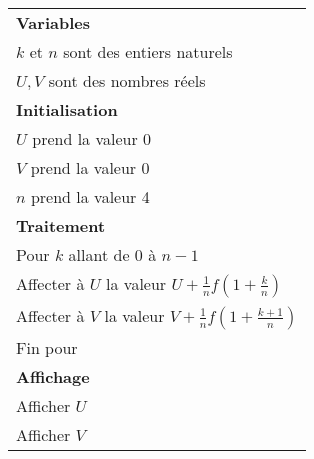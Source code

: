 \documentclass[10pt]{article}
\begin{document}
\begin{center}
\begin{tabularx}{0.6\linewidth}{|X|}\hline
\textbf{Variables}\\ 
\hspace{0,8cm}$k$ et $n$ sont des entiers naturels \\
\hspace{0,8cm}$U, V$ sont des nombres réels\\ 
\textbf{Initialisation}\\ 
\hspace{0,8cm} $U$ prend la valeur 0\\
\hspace{0,8cm} $V$ prend la valeur 0\\
\hspace{0,8cm} $n$ prend la valeur 4\\ 
\textbf{Traitement}\\ 
Pour $k$ allant de $0$ à $n - 1$\\ 
\hspace{0,8cm} Affecter à $U$ la valeur $U + \frac{1}{n}f\left(1 + \frac{k}{n}\right)$\\ 
\hspace{0,8cm} Affecter à $V$ la valeur $V + \frac{1}{n}f\left(1 + \frac{k + 1}{n}\right)$\\ 
Fin pour\\ 
\textbf{Affichage}\\ 
\hspace{0,8cm} Afficher $U$\\ 
\hspace{0,8cm} Afficher $V$\\ \hline 
\end{tabularx}
\end{center} 
\end{document}
